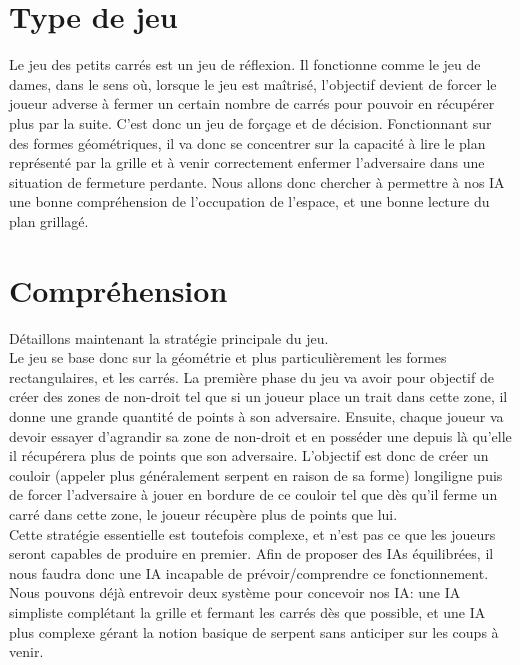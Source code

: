 \documentclass[a4paper,12pt]{report}
\begin{document}
\section{Type de jeu}

Le jeu des petits carr\'es est un jeu de r\'eflexion. Il fonctionne comme le jeu de dames, dans le sens o\`u, lorsque le jeu est ma\^itris\'e, l'objectif devient de forcer le joueur adverse \`a fermer un certain nombre de carr\'es pour pouvoir en r\'ecup\'erer plus par la suite. C'est donc un jeu de for\c{c}age et de d\'ecision. Fonctionnant sur des formes g\'eom\'etriques, il va donc se concentrer sur la capacit\'e \`a lire le plan repr\'esent\'e par la grille et \`a venir correctement enfermer l'adversaire dans une situation de fermeture perdante. Nous allons donc chercher \`a permettre \`a nos IA une bonne compr\'ehension de l'occupation de l'espace, et une bonne lecture du plan grillag\'e.

\section{Compr\'ehension}

D\'etaillons maintenant la strat\'egie principale du jeu.\\
Le jeu se base donc sur la g\'eom\'etrie et plus particuli\`erement les formes rectangulaires, et les carr\'es. La premi\`ere phase du jeu va avoir pour objectif de cr\'eer des zones de \og{}non-droit\fg{} tel que si un joueur place un trait dans cette zone, il donne une grande quantit\'e de points \`a son adversaire. Ensuite, chaque joueur va devoir essayer d'agrandir sa zone de non-droit et en \og{}poss\'eder\fg{} une depuis l\`a qu'elle il r\'ecup\'erera plus de points que son adversaire. L'objectif est donc de cr\'eer un couloir (appeler plus g\'en\'eralement \og{}serpent\fg{} en raison de sa forme) longiligne puis de forcer l'adversaire \`a jouer en bordure de ce couloir tel que d\`es qu'il ferme un carr\'e dans cette zone, le joueur r\'ecup\`ere plus de points que lui. \\
Cette strat\'egie essentielle est toutefois complexe, et n'est pas ce que les joueurs seront capables de produire en premier. Afin de proposer des IAs \'equilibr\'ees,  il nous faudra donc une IA incapable de pr\'evoir/comprendre ce fonctionnement. \\
Nous pouvons d\'ej\`a entrevoir deux syst\`eme pour concevoir nos IA: une IA simpliste compl\'etant la grille et fermant les carr\'es d\`es que possible, et une IA plus complexe g\'erant la notion basique de serpent sans anticiper sur les coups \`a venir.
\end{document}
